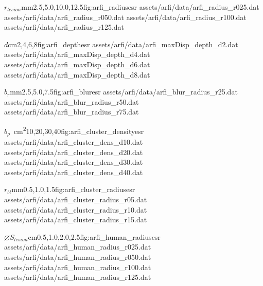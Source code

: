 		\begin{multicols}{2}
			\characterizationDataTable%
				{$r_{lesion}$}{mm}{2.5,5.0,10.0,12.5}{fig:arfi_radius}{esr}%
				{assets/arfi/data/arfi_radius_r025.dat}%
				{assets/arfi/data/arfi_radius_r050.dat}%
				{assets/arfi/data/arfi_radius_r100.dat}%
				{assets/arfi/data/arfi_radius_r125.dat}

			\characterizationDataTable%
				{$d$}{cm}{2,4,6,8}{fig:arfi_depth}{esr}%
				{assets/arfi/data/arfi_maxDisp_depth_d2.dat}%
				{assets/arfi/data/arfi_maxDisp_depth_d4.dat}%
				{assets/arfi/data/arfi_maxDisp_depth_d6.dat}%
				{assets/arfi/data/arfi_maxDisp_depth_d8.dat}

			\characterizationDataTable%
				{$b_r$}{mm}{2.5,5.0,7.5}{fig:arfi_blur}{esr}%
				{assets/arfi/data/arfi_blur_radius_r25.dat}%
				{assets/arfi/data/arfi_blur_radius_r50.dat}%
				{assets/arfi/data/arfi_blur_radius_r75.dat}%
				{}

			\characterizationDataTable%
				{$b_\rho$}{\si{\per\cm\squared}}{10,20,30,40}{fig:arfi_cluster_density}{esr}%
				{assets/arfi/data/arfi_cluster_dens_d10.dat}%
				{assets/arfi/data/arfi_cluster_dens_d20.dat}%
				{assets/arfi/data/arfi_cluster_dens_d30.dat}%
				{assets/arfi/data/arfi_cluster_dens_d40.dat}

			\characterizationDataTable%
				{$r_{bl}$}{mm}{0.5,1.0,1.5}{fig:arfi_cluster_radius}{esr}%
				{assets/arfi/data/arfi_cluster_radius_r05.dat}%
				{assets/arfi/data/arfi_cluster_radius_r10.dat}%
				{assets/arfi/data/arfi_cluster_radius_r15.dat}%
				{}

			\characterizationDataTable%
				{$\diameter S_{lesion}$}{cm}{0.5,1.0,2.0,2.5}{fig:arfi_human_radius}{esr}%
				{assets/arfi/data/arfi_human_radius_r025.dat}%
				{assets/arfi/data/arfi_human_radius_r050.dat}%
				{assets/arfi/data/arfi_human_radius_r100.dat}%
				{assets/arfi/data/arfi_human_radius_r125.dat}
		\end{multicols}

